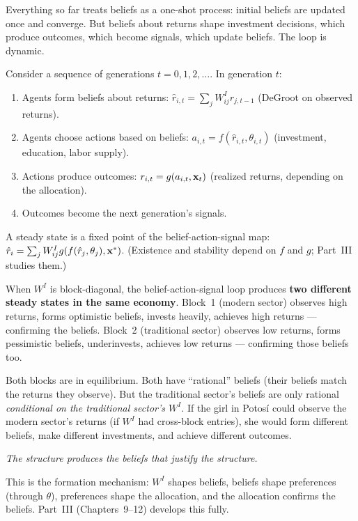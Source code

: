 \documentclass[../structural_economics_book.tex]{subfiles}
\begin{document}
Everything so far treats beliefs as a one-shot process: initial beliefs are updated once and converge. But beliefs about returns shape investment decisions, which produce outcomes, which become signals, which update beliefs. The loop is dynamic.

\begin{definition}\label{ch08:prop:loop}
Consider a sequence of generations $t = 0, 1, 2, \ldots$. In generation $t$:
\begin{enumerate}
\item Agents form beliefs about returns: $\hat{r}_{i,t} = \sum_j W^I_{ij} r_{j,t-1}$ (DeGroot on observed returns).
\item Agents choose actions based on beliefs: $a_{i,t} = f(\hat{r}_{i,t}, \theta_{i,t})$ (investment, education, labor supply).
\item Actions produce outcomes: $r_{i,t} = g(a_{i,t}, \mathbf{x}_t)$ (realized returns, depending on the allocation).
\item Outcomes become the next generation's signals.
\end{enumerate}
A steady state is a fixed point of the belief-action-signal map: $\hat{r}_i = \sum_j W^I_{ij} g(f(\hat{r}_j, \theta_j), \mathbf{x}^*)$. (Existence and stability depend on $f$ and $g$; Part~III studies them.)
\end{definition}

\begin{keyinsight}
When $W^I$ is block-diagonal, the belief-action-signal loop produces \textbf{two different steady states in the same economy}. Block~1 (modern sector) observes high returns, forms optimistic beliefs, invests heavily, achieves high returns --- confirming the beliefs. Block~2 (traditional sector) observes low returns, forms pessimistic beliefs, underinvests, achieves low returns --- confirming those beliefs too.

Both blocks are in equilibrium. Both have ``rational'' beliefs (their beliefs match the returns they observe). But the traditional sector's beliefs are only rational \textit{conditional on the traditional sector's $W^I$}. If the girl in Potos\'{i} could observe the modern sector's returns (if $W^I$ had cross-block entries), she would form different beliefs, make different investments, and achieve different outcomes.

\textit{The structure produces the beliefs that justify the structure.}

This is the formation mechanism: $W^I$ shapes beliefs, beliefs shape preferences (through $\theta$), preferences shape the allocation, and the allocation confirms the beliefs. Part~III (Chapters~9--12) develops this fully.
\end{keyinsight}
\end{document}
